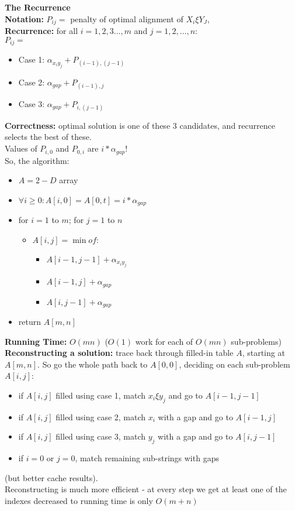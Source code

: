 \documentclass{scrartcl}
\begin{document}
{\bf The Recurrence}\\
{\bf Notation: } $P_{ij} = $ penalty of optimal alignment of $X_i \xi Y_J$,\\
{\bf Recurrence: } for all $i = 1, 2, 3\dots, m$ and $j = 1, 2, \dots, n$: \\
$P_{ij} = $
\begin{itemize}
\item Case 1: $\alpha_{x_iy_j} + P_{(i-1), (j-1)}$
\item Case 2: $\alpha_{gap} + P_{(i-1), j}$
\item Case 3: $\alpha_{gap} + P_{i, (j-1)}$
\end{itemize}
{\bf Correctness: } optimal solution is one of these 3 candidates, and
recurrence selects the best of these.\\
Values of $P_{i, 0}$ and $P_{0, i}$ are $i * \alpha_{gap}$!\\

So, the algorithm:
\begin{itemize}
\item $A = 2-D$ array
\item $\forall i \geq 0:A[i, 0] = A[0,t] = i * \alpha_{gap}$
\item for $i = 1$ to $m$; for $j=1$ to $n$
  \begin{itemize}
  \item $A[i, j] = \min of: $
    \begin{itemize}
    \item $A[i-1, j-1] + \alpha_{x_iy_j}$
    \item $A[i-1, j] + \alpha_{gap}$
    \item $A[i, j-1] + \alpha_{gap}$
    \end{itemize}
  \end{itemize}
\item return $A[m,n]$
\end{itemize}

{\bf Running Time: } $O(mn)$ ($O(1)$ work for each of $O(mn)$ sub-problems)\\

{\bf Reconstructing a solution: } trace back through filled-in table $A$,
starting at $A[m, n]$. So go the whole path back to $A[0,0]$, deciding on each
sub-problem $A[i, j]$:
\begin{itemize}
\item if $A[i,j]$ filled using case 1, match $x_i \xi y_j$ and go to $A[i-1,
  j-1]$
\item if $A[i,j]$ filled using case 2, match $x_i$ with a gap and go to $A[i-1,
  j]$
\item if $A[i,j]$ filled using case 3, match $y_j$ with a gap and go to $A[i,
  j-1]$ 
\item if $i=0$ or $j=0$, match remaining sub-strings with gaps
\end{itemize}
(but better cache results).\\
Reconstructing is much more efficient - at every step we get at least one of the
indexes decreased to running time is only $O(m+n)$
\end{document}

